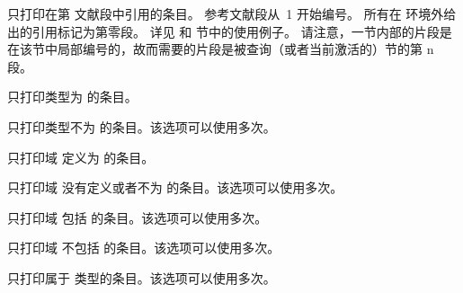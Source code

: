 \begin{optionlist*}
只打印在第  文献段中引用的条目。
参考文献段从~1 开始编号。
所有在  环境外给出的引用标记为第零段。
详见  和  节中的使用例子。
请注意，一节内部的片段是在该节中局部编号的，故而需要的片段是被查询（或者当前激活的）节的第 n 段。



只打印类型为  的条目。



只打印类型不为  的条目。该选项可以使用多次。



只打印域  定义为  的条目。



只打印域  没有定义或者不为  的条目。该选项可以使用多次。



只打印域  包括  的条目。该选项可以使用多次。



只打印域  不包括  的条目。该选项可以使用多次。



只打印属于  类型的条目。该选项可以使用多次。



\end{optionlist*}
